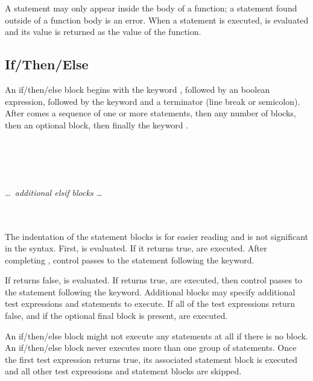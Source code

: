 \begin{syntax}
 \expr{}
\end{syntax}

A  statement may only appear inside the body of a
function; a  statement found outside of a function body is
an error.  When a  statement is executed, \expr{} is
evaluated and its value is returned as the value of the function.



\subsection{If/Then/Else}

An if/then/else block begins with the keyword , followed by an
boolean expression, followed by the keyword  and a
terminator (line break or semicolon).  After  comes a
sequence of one or more statements, then any number of 
blocks, then an optional  block, then finally the keyword
.

\begin{syntax}
   \\
\codeindent{} \\
   \\
\codeindent{} \\
\textit{\dots\ additional elsif blocks \dots} \\
 \\
\codeindent{} \\
\end{syntax}

The indentation of the statement blocks is for easier reading and is
not significant in the syntax.  First,  is evaluated.  If it
returns true,  are executed.  After completing
, control passes to the statement following the
 keyword.  

If  returns false,  is evaluated.  If  returns
true,  are executed, then control passes to the
statement following the  keyword.  Additional 
blocks may specify additional test expressions and statements to
execute.  If all of the test expressions return false, and if the
optional final  block is present,  are
executed.

An if/then/else block might not execute any statements at all if there
is no  block.  An if/then/else block never executes more
than one group of statements. Once the first test expression returns
true, its associated statement block is executed and all other test
expressions and statement blocks are skipped.



